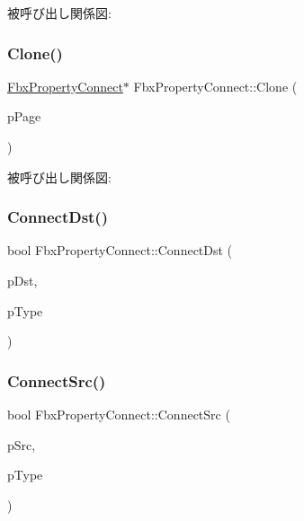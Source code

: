 被呼び出し関係図\+:
\mbox{\label{class_fbx_property_connect_aff713a2a67f9a1cfb0ecad7e548304ea}} 
\subsubsection{\texorpdfstring{Clone()}{Clone()}}
{\footnotesize\ttfamily \hyperlink{class_fbx_property_connect}{Fbx\+Property\+Connect}$\ast$ Fbx\+Property\+Connect\+::\+Clone (\begin{DoxyParamCaption}\item[{\hyperlink{class_fbx_property_page}{Fbx\+Property\+Page} $\ast$}]{p\+Page }\end{DoxyParamCaption})}

被呼び出し関係図\+:
\mbox{\label{class_fbx_property_connect_a9d8f3384bbc9516b873a081f1f328213}} 
\subsubsection{\texorpdfstring{Connect\+Dst()}{ConnectDst()}}
{\footnotesize\ttfamily bool Fbx\+Property\+Connect\+::\+Connect\+Dst (\begin{DoxyParamCaption}\item[{\hyperlink{class_fbx_property_connect}{Fbx\+Property\+Connect} $\ast$}]{p\+Dst,  }\item[{\hyperlink{class_fbx_connection_a3df448a5db356652ab99fd2be2553749}{Fbx\+Connection\+::\+E\+Type}}]{p\+Type }\end{DoxyParamCaption})}

\mbox{\label{class_fbx_property_connect_af5c78b8a65708e2e4f82da4db2deb76a}} 
\subsubsection{\texorpdfstring{Connect\+Src()}{ConnectSrc()}}
{\footnotesize\ttfamily bool Fbx\+Property\+Connect\+::\+Connect\+Src (\begin{DoxyParamCaption}\item[{\hyperlink{class_fbx_property_connect}{Fbx\+Property\+Connect} $\ast$}]{p\+Src,  }\item[{\hyperlink{class_fbx_connection_a3df448a5db356652ab99fd2be2553749}{Fbx\+Connection\+::\+E\+Type}}]{p\+Type }\end{DoxyParamCaption})}

